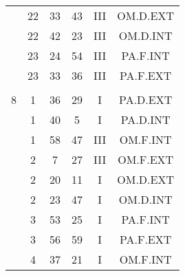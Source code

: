 \documentclass[12pt, a4paper]{article}
\begin{document}
\begin{multicols}{3}
{\begin{tabular}{c c c c c c}
	 	 	 	 & 22 & 33 & 43 & III & OM.D.EXT\\%
	 	 	 	 & 22 & 42 & 23 & III & OM.D.INT\\%
	 	 	 	 & 23 & 24 & 54 & III & PA.F.INT\\%
	 	 	 	 & 23 & 33 & 36 & III & PA.F.EXT\\%
	 	 	 	 & & & & & \\%
	 	 	 	8 & 1 & 36 & 29 & I & PA.D.EXT\\%
	 	 	 	 & 1 & 40 & 5 & I & PA.D.INT\\%
	 	 	 	 & 1 & 58 & 47 & III & OM.F.INT\\%
	 	 	 	 & 2 & 7 & 27 & III & OM.F.EXT\\%
	 	 	 	 & 2 & 20 & 11 & I & OM.D.EXT\\%
	 	 	 	 & 2 & 23 & 47 & I & OM.D.INT\\%
	 	 	 	 & 3 & 53 & 25 & I & PA.F.INT\\%
	 	 	 	 & 3 & 56 & 59 & I & PA.F.EXT\\%
	 	 	 	 & 4 & 37 & 21 & I & OM.F.INT\\%
	 	 \end{tabular}
 	}
\end{multicols}
\end{document}
